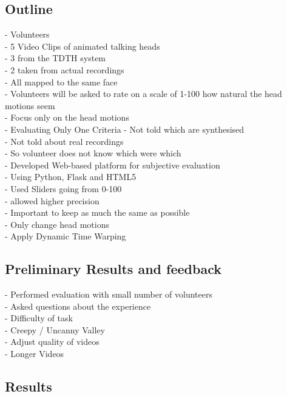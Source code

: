 \documentclass[bsc,frontabs,twoside,singlespacing,parskip]{infthesis}
\begin{document}
\subsection{Outline}
- Volunteers\\
- 5 Video Clips of animated talking heads \\
- 3 from the TDTH system\\
- 2 taken from actual recordings \\
- All mapped to the same face \\
- Volunteers will be asked to rate on a scale of 1-100 how natural the head motions seem \\
- Focus only on the head motions \\
- Evaluating Only One Criteria
- Not told which are synthesised\\
- Not told about real recordings \\
- So volunteer does not know which were which\\

- Developed Web-based platform for subjective evaluation\\
- Using Python, Flask and HTML5\\
- Used Sliders going from 0-100 \\
- allowed higher precision \\


- Important to keep as much the same as possible\\
- Only change head motions\\
- Apply Dynamic Time Warping\\ 

\subsection{Preliminary Results and feedback}

- Performed evaluation with small number of volunteers \\

- Asked questions about the experience \\
- Difficulty of task \\
- Creepy / Uncanny Valley \\
- Adjust quality of videos \\
- Longer Videos \\ 

\subsection{Results}
\end{document}

